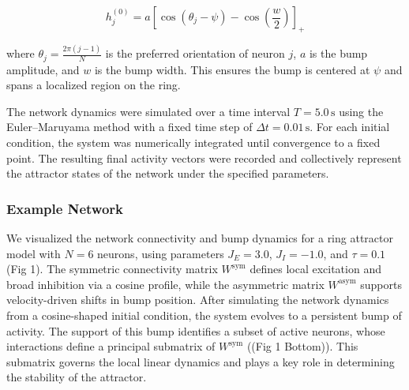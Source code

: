 \documentclass[11pt,a4paper]{article}
\begin{document}
\begin{equation}
h_j^{(0)} = a \left[\cos(\theta_j - \psi) - \cos\left(\frac{w}{2}\right)\right]_+
\end{equation}


where $\theta_j = \frac{2\pi(j-1)}{N}$ is the preferred orientation of neuron $j$, $a$ is the bump amplitude, and $w$ is the bump width. This ensures the bump is centered at $\psi$ and spans a localized region on the ring.

The network dynamics were simulated over a time interval $T = 5.0\,\text{s}$ using the Euler–Maruyama  method with a fixed time step of $\Delta t = 0.01\,\text{s}$. For each initial condition, the system was numerically integrated until convergence to a fixed point. 
The resulting final activity vectors were recorded and collectively represent the attractor states of the network under the specified parameters.

\subsubsection*{Example Network}

We visualized the network connectivity and bump dynamics for a ring attractor model with $N = 6$ neurons, using parameters $J_E = 3.0$, $J_I = -1.0$, and $\tau = 0.1$ (Fig 1). 
The symmetric connectivity matrix $W^{\text{sym}}$ defines local excitation and broad inhibition via a cosine profile, while the asymmetric matrix $W^{\text{asym}}$ supports velocity-driven shifts in bump position. 
After simulating the network dynamics from a cosine-shaped initial condition, the system evolves to a persistent bump of activity. 
The support of this bump identifies a subset of active neurons, whose interactions define a principal submatrix of $W^{\text{sym}}$ ((Fig 1 Bottom)). 
This submatrix governs the local linear dynamics and plays a key role in determining the stability of the attractor.
\end{document}
